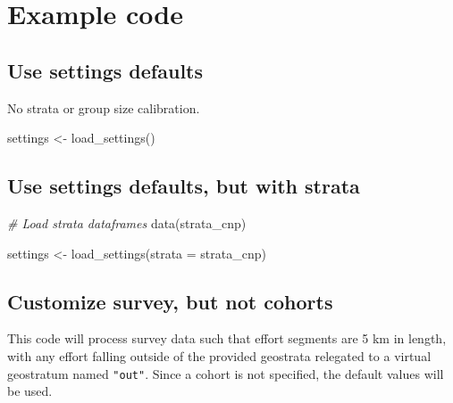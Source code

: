 \documentclass[
]{book}
\newenvironment{Shaded}{\begin{snugshade}}{\end{snugshade}}
\newcommand{\AttributeTok}[1]{\textcolor[rgb]{0.77,0.63,0.00}{#1}}
\newcommand{\CommentTok}[1]{\textcolor[rgb]{0.56,0.35,0.01}{\textit{#1}}}
\newcommand{\FunctionTok}[1]{\textcolor[rgb]{0.00,0.00,0.00}{#1}}
\newcommand{\NormalTok}[1]{#1}
\newcommand{\OtherTok}[1]{\textcolor[rgb]{0.56,0.35,0.01}{#1}}
\begin{document}
\hypertarget{example-code}{%
\section*{Example code}\label{example-code}}

\hypertarget{use-settings-defaults}{%
\subsection*{Use settings defaults}\label{use-settings-defaults}}

No strata or group size calibration.

\begin{Shaded}
\begin{Highlighting}[]
\NormalTok{settings }\OtherTok{\textless{}{-}} \FunctionTok{load\_settings}\NormalTok{()}
\end{Highlighting}
\end{Shaded}

\hypertarget{use-settings-defaults-but-with-strata}{%
\subsection*{Use settings defaults, but with strata}\label{use-settings-defaults-but-with-strata}}

\begin{Shaded}
\begin{Highlighting}[]
\CommentTok{\# Load strata dataframes}
\FunctionTok{data}\NormalTok{(strata\_cnp)}

\NormalTok{settings }\OtherTok{\textless{}{-}} \FunctionTok{load\_settings}\NormalTok{(}\AttributeTok{strata =}\NormalTok{ strata\_cnp)}
\end{Highlighting}
\end{Shaded}

\hypertarget{customize-survey-but-not-cohorts}{%
\subsection*{Customize survey, but not cohorts}\label{customize-survey-but-not-cohorts}}

This code will process survey data such that effort segments are 5 km in length, with any effort falling outside of the provided geostrata relegated to a virtual geostratum named \texttt{"out"}. Since a cohort is not specified, the default values will be used.
\end{document}
